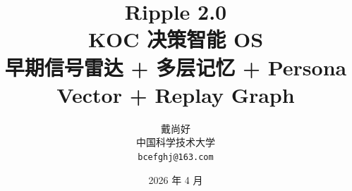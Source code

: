 \documentclass[11pt, a4paper, fontset=mac, scheme=plain, UTF8]{ctexart}
\title{\Huge\bfseries\color{ripple-primary} Ripple 2.0\\[0.3em]\large\color{ripple-dark} KOC 决策智能 OS \\ \normalsize 早期信号雷达 + 多层记忆 + Persona Vector + Replay Graph}
\author{\large 戴尚好 \\ \normalsize 中国科学技术大学 \\ \normalsize \texttt{bcefghj@163.com}}
\date{2026 年 4 月}
\begin{document}

\thispagestyle{empty}
\newpage

\renewcommand{\contentsname}{\color{ripple-primary} 目录}
\tableofcontents
\thispagestyle{plain}
\newpage

\renewcommand{\listfigurename}{\color{ripple-primary} 图目录}
\listoffigures
\newpage

\renewcommand{\listtablename}{\color{ripple-primary} 表目录}
\listoftables
\newpage


\newpage


\newpage


\newpage


\newpage


\newpage


\newpage


\newpage


\newpage


\newpage


\end{document}
